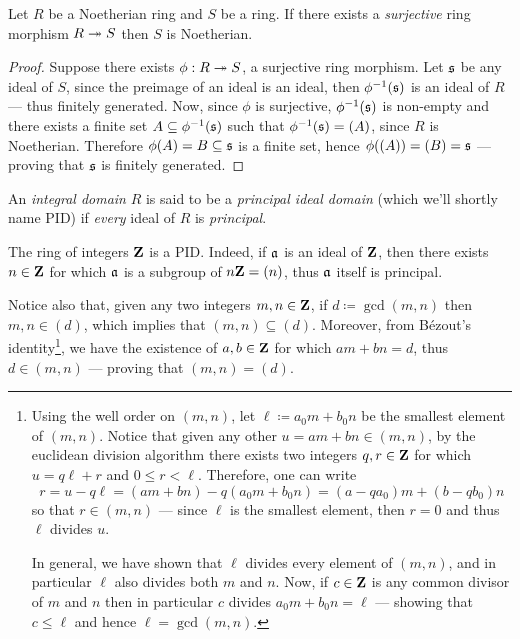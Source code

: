 \begin{proposition}
    \label{prop:image-of-noetherian-is-noetherian}
    Let \(R\) be a Noetherian ring and \(S\) be a ring. If there exists a
    \emph{surjective} ring morphism \(R \twoheadrightarrow S\) then \(S\) is Noetherian.
\end{proposition}

\begin{proof}
    Suppose there exists \(\phi: R \twoheadrightarrow S\), a surjective ring morphism. Let
    \(\mathfrak{s}\) be any ideal of \(S\), since the preimage of an ideal is an ideal,
    then \(\phi^{-1}(\mathfrak{s})\) is an ideal of \(R\) --- thus finitely
    generated. Now, since \(\phi\) is surjective, \(\phi^{-1}(\mathfrak{s})\) is
    non-empty and there exists a finite set \(A \subseteq \phi^{-1}(\mathfrak{s})\)
    such that \(\phi^{-1}(\mathfrak{s}) = (A)\), since \(R\) is Noetherian. Therefore
    \(\phi(A) = B \subseteq \mathfrak{s}\) is a finite set, hence
    \(\phi((A)) = (B) = \mathfrak{s}\) --- proving that \(\mathfrak{s}\) is finitely
    generated.
\end{proof}

\begin{definition}
    \label{def:PID}
    An \emph{integral domain} \(R\) is said to be a \emph{principal ideal domain}
    (which we'll shortly name PID) if \emph{every} ideal of \(R\) is
    \emph{principal}.
\end{definition}

\begin{example}
    \label{exp:integers-are-PID}
    The ring of integers \(\mathbf{Z}\) is a PID. Indeed, if \(\mathfrak{a}\) is an ideal of
    \(\mathbf{Z}\), then there exists \(n \in \mathbf{Z}\) for which \(\mathfrak{a}\) is a subgroup of
    \(n \mathbf{Z} = (n)\), thus \(\mathfrak{a}\) itself is principal.

    Notice also that, given any two integers \(m, n \in \mathbf{Z}\), if
    \(d \coloneq \gcd(m, n)\) then \(m, n \in (d)\), which implies that
    \((m, n) \subseteq (d)\). Moreover, from Bézout's identity\footnote{Using the
        well order on \((m, n)\), let \(\ell
        \coloneq a_0 m + b_0 n\) be the smallest element of \((m, n)\). Notice that
        given any other \(u = a m + b n \in (m, n)\), by the euclidean division
        algorithm there exists two integers \(q, r \in \mathbf{Z}\) for which \(u = q \ell +
        r\) and \(0 \leq r < \ell\). Therefore, one can write
        \[
            r = u - q \ell
            = (a m + b n) - q (a_0 m + b_0 n) = (a - q a_0) m + (b - q b_0) n
        \]
        so that \(r \in (m, n)\) --- since \(\ell\) is the smallest element, then \(r
        = 0\) and thus \(\ell\) divides \(u\).

        In general, we have shown that \(\ell\) divides every element of \((m, n)\),
        and in particular \(\ell\) also divides both \(m\) and \(n\). Now, if \(c \in
        \mathbf{Z}\) is any common divisor of \(m\) and \(n\) then in particular \(c\) divides
        \(a_0 m + b_0 n = \ell\) --- showing that \(c \leq \ell\) and hence \(\ell =
        \gcd(m, n)\).
    },
    we have the existence of \(a, b \in \mathbf{Z}\) for which \(a m + b n = d\), thus
    \(d \in (m, n)\) --- proving that \((m, n) = (d)\).
\end{example}

